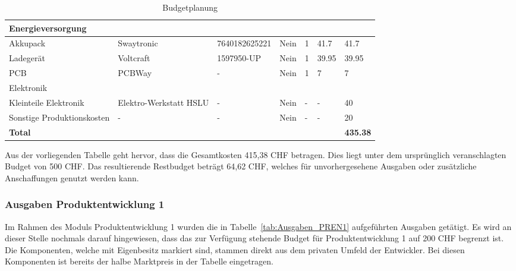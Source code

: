 \documentclass[main.tex]{subfiles} %
\begin{document}
\begin{table}[h]
\begin{tabular}{|p{3cm}|p{2.5cm}|p{3cm}|p{1cm}|p{1cm}|p{1.5cm}|p{1cm}|}
        \rowcolor{lightgray} Energieversorgung &                       &                         &                 &                &                           &                             \\ \hline
        Akkupack                               & Swaytronic            & 7640182625221           & Nein            & 1              & 41.7                      & 41.7                        \\ \hline
        Ladegerät                              & Voltcraft             & 1597950-UP              & Nein            & 1              & 39.95                     & 39.95                       \\ \hline
        PCB                                    & PCBWay                & -                       & Nein            & 1              & 7                         & 7                           \\ \hline
        \rowcolor{lightgray} Elektronik        &                       &                         &                 &                &                           &                             \\ \hline
        Kleinteile Elektronik                  & Elektro-Werkstatt HSLU& -                       & Nein            & -              & -                         & 40                          \\ \hline
        Sonstige Produktionskosten             & -                     & -                       & Nein            & -              & -                         & 20                          \\ \hline
        \textbf{Total}                         &                       &                         &                 &                &                           & \textbf{435.38}             \\ \hline
    \end{tabular}
    \caption{Budgetplanung}
    \label{tab:Budgetplanung}
\end{table}

Aus der vorliegenden Tabelle geht hervor, dass die Gesamtkosten 415,38 CHF betragen.
Dies liegt unter dem ursprünglich veranschlagten Budget von 500 CHF. 
Das resultierende Restbudget beträgt 64,62 CHF, welches für unvorhergesehene Ausgaben oder zusätzliche
Anschaffungen genutzt werden kann.

\subsubsection{Ausgaben Produktentwicklung 1}
Im Rahmen des Moduls Produktentwicklung 1 wurden die in
Tabelle~\ref{tab:Ausgaben_PREN1} aufgeführten Ausgaben getätigt. Es wird 
an dieser Stelle nochmals darauf hingewiesen, dass das zur Verfügung stehende 
Budget für Produktentwicklung 1 auf 200 CHF begrenzt ist. Die Komponenten, welche mit 
Eigenbesitz markiert sind, stammen direkt aus dem privaten Umfeld der Entwickler.
Bei diesen Komponenten ist bereits der halbe Marktpreis in der Tabelle eingetragen.
\end{document}
